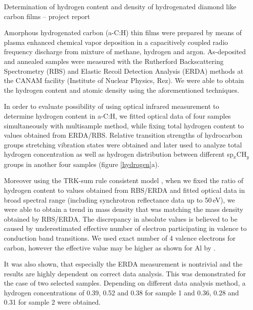 \documentclass[10pt]{article}
\begin{document}
\pagestyle{empty}

\begin{center}
\LARGE{Determination of hydrogen content and density of hydrogenated diamond like carbon films -- project report}
\end{center}
\vspace{0.1cm}

Amorphous hydrogenated carbon (a-C:H) thin films were prepared by means of plasma enhanced chemical vapor deposition in a capacitively coupled radio frequency discharge from mixture of methane, hydrogen and argon.
As-deposited and annealed samples were measured with the Rutherford Backscattering Spectrometry (RBS) and Elastic Recoil Detection Analysis (ERDA) methods at the CANAM facility (Institute of Nuclear Physics, Rez).
We were able to obtain the hydrogen content and atomic density using the aforementioned techniques.

In order to evaluate possibility of using optical infrared measurement to determine hydrogen content in a-C:H, we fitted optical data of four samples simultaneously with multisample method, while fixing total hydrogen content to values obtained from ERDA/RBS. Relative transition strengths of hydrocarbon groups stretching vibration states were obtained and later used to analyze total hydrogen concentration as well as hydrogen distribution between different sp$_x$CH$_y$ groups in another four samples (figure \ref{hydrogen}a).

Moreover using the TRK-sum rule consistent model \cite{Franta2013432}, when we fixed the ratio of hydrogen content to values obtained from RBS/ERDA and fitted optical data in broad spectral range (including synchrotron reflectance data up to 50\,eV), we were able to obtain a trend in mass density that was matching the mass density obtained by RBS/ERDA.
The discrepancy in absolute values is believed to be caused by underestimated effective number of electron participating in valence to conduction band transitions.
We used exact number of 4 valence electrons for carbon, however the effective value may be higher as shown for Al by \citet{Shiles1980}.

It was also shown, that especially the ERDA measurement is nontrivial and the results are highly dependent on correct data analysis. This was demonstrated for the case of two selected samples. Depending on different data analysis method, a hydrogen concentrations of 0.39, 0.52 and 0.38 for sample 1 and 0.36, 0.28 and 0.31 for sample 2 were obtained. 
\end{document}
